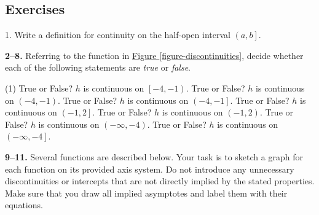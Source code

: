 \documentclass[10pt,oneside,]{book}
\theoremstyle{plain}
\theoremstyle{definition}
\numberwithin{equation}{section}
\newcommand{\ointerval}[2]{\left(#1,#2\right)}
\newcommand{\cointerval}[2]{\left[\left.#1,#2\right)\right.}
\newcommand{\ocinterval}[2]{\left(\left.#1,#2\right]\right.}
\begin{document}
\subsection[Exercises]{Exercises}\label{exercises-15}
\begin{exerciselist}
\item[1.]\hypertarget{exercise-113}{\null}Write a definition for continuity on the half-open interval \(\ocinterval{a}{b}\).%
\par\smallskip
\end{exerciselist}
\textbf{2--8. }\hypertarget{exercisegroup-26}{\null}Referring to the function in \hyperref[figure-discontinuities]{Figure \ref{figure-discontinuities}}, decide whether each of the following statements are \emph{true} or \emph{false}.%
\par
\begin{exercisegroup}(1)
\exercise[2.]\hypertarget{exercise-114}{\null}True or False? \(h\) is continuous on \(\cointerval{-4}{-1}\).%
\exercise[3.]\hypertarget{exercise-115}{\null}True or False? \(h\) is continuous on \(\ointerval{-4}{-1}\).%
\exercise[4.]\hypertarget{exercise-116}{\null}True or False? \(h\) is continuous on \(\ocinterval{-4}{-1}\).%
\exercise[5.]\hypertarget{exercise-117}{\null}True or False? \(h\) is continuous on \(\ocinterval{-1}{2}\).%
\exercise[6.]\hypertarget{exercise-118}{\null}True or False? \(h\) is continuous on \(\ointerval{-1}{2}\).%
\exercise[7.]\hypertarget{exercise-119}{\null}True or False? \(h\) is continuous on \(\ointerval{-\infty}{-4}\).%
\exercise[8.]\hypertarget{exercise-120}{\null}True or False? \(h\) is continuous on \(\ocinterval{-\infty}{-4}\).%
\end{exercisegroup}
\par\smallskip\noindent
\textbf{9--11. }\hypertarget{exercisegroup-27}{\null}Several functions are described below. Your task is to sketch a graph for each function on its provided axis system. Do not introduce any unnecessary discontinuities or intercepts that are not directly implied by the stated properties. Make sure that you draw all implied asymptotes and label them with their equations.%
\par
\end{document}
